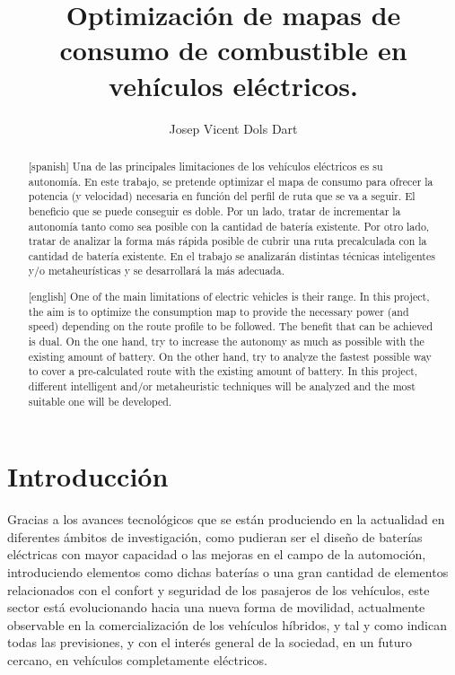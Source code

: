 \documentclass[11pt,spanish,listoffigures,listoftables]{tfgetsinf}
\title{Optimización de mapas de consumo de combustible en vehículos eléctricos.}
\author{Josep Vicent Dols Dart}
\begin{document}
	\lstset{language=Python, frame=none}

\begin{abstract}[spanish]
Una de las principales limitaciones de los vehículos eléctricos es su autonomía. En este trabajo, se pretende optimizar el mapa de consumo para ofrecer la potencia (y velocidad) necesaria en función del perfil de ruta que se va a seguir. El beneficio que se puede conseguir es doble. Por un lado, tratar de incrementar la autonomía tanto como sea posible con la cantidad de batería existente. Por otro lado, tratar de analizar la forma más rápida posible de cubrir una ruta precalculada con la cantidad de batería existente. En el trabajo se analizarán distintas técnicas inteligentes y/o metaheurísticas y se desarrollará la más adecuada.
\end{abstract}

\begin{abstract}[english]
One of the main limitations of electric vehicles is their range. In this project, the aim is to optimize the consumption map to provide the necessary power (and speed) depending on the route profile to be followed. The benefit that can be achieved is dual. On the one hand, try to increase the autonomy as much as possible with the existing amount of battery. On the other hand, try to analyze the fastest possible way to cover a pre-calculated route with the existing amount of battery. In this project, different intelligent and/or metaheuristic techniques will be analyzed and the most suitable one will be developed.
\end{abstract}

\mainmatter


\chapter{Introducción}
Gracias a los avances tecnológicos que se están produciendo en la actualidad en diferentes ámbitos de investigación, como pudieran ser el diseño de baterías eléctricas con mayor capacidad o las mejoras en el campo de la automoción, introduciendo elementos como dichas baterías o una gran cantidad de elementos relacionados con el confort y seguridad de los pasajeros de los vehículos, este sector está evolucionando hacia una nueva forma de movilidad, actualmente observable en la comercialización de los vehículos híbridos, y tal y como indican todas las previsiones, y con el interés general de la sociedad, en un futuro cercano, en vehículos completamente eléctricos.
\end{document}
